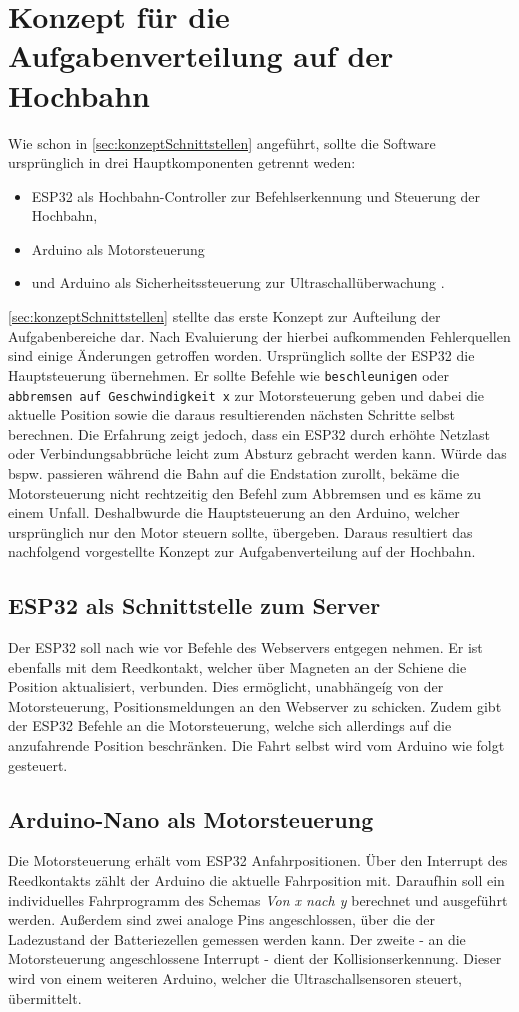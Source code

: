 \section{Konzept für die Aufgabenverteilung auf der Hochbahn}
\label{sec:hochbahnAlsClient}
Wie schon in \autoref{sec:konzeptSchnittstellen} angeführt, sollte die Software ursprünglich in drei Hauptkomponenten getrennt weden:
\begin{itemize}
	\item ESP32 als Hochbahn-Controller zur Befehlserkennung und Steuerung der Hochbahn,
	\item Arduino als Motorsteuerung
	\item  und Arduino als Sicherheitssteuerung zur Ultraschallüberwachung .
\end{itemize}
\autoref{sec:konzeptSchnittstellen} stellte das erste Konzept zur Aufteilung der Aufgabenbereiche dar. Nach Evaluierung der hierbei aufkommenden Fehlerquellen sind einige Änderungen getroffen worden.
Ursprünglich sollte der ESP32 die Hauptsteuerung übernehmen. Er sollte Befehle wie \texttt{beschleunigen} oder \texttt{abbremsen auf Geschwindigkeit x} zur Motorsteuerung geben und dabei die aktuelle Position sowie die daraus resultierenden nächsten Schritte selbst berechnen. Die Erfahrung zeigt jedoch, dass ein ESP32 durch erhöhte Netzlast oder Verbindungsabbrüche leicht zum Absturz gebracht werden kann. Würde das bspw. passieren während die Bahn auf die Endstation zurollt, bekäme die Motorsteuerung nicht rechtzeitig den Befehl zum Abbremsen und es käme zu einem Unfall.
Deshalbwurde die Hauptsteuerung an den Arduino, welcher ursprünglich nur den Motor steuern sollte, übergeben. Daraus resultiert das nachfolgend vorgestellte Konzept zur Aufgabenverteilung auf der Hochbahn.

\subsection{ESP32 als Schnittstelle zum Server}
\label{sec:aufgabeESP}
Der ESP32 soll nach wie vor Befehle des Webservers entgegen nehmen. Er ist ebenfalls mit dem Reedkontakt, welcher über Magneten an der Schiene die Position aktualisiert, verbunden. Dies ermöglicht, unabhängeíg von der Motorsteuerung, Positionsmeldungen an den Webserver zu schicken. Zudem gibt der ESP32 Befehle an die Motorsteuerung, welche sich allerdings auf die anzufahrende Position beschränken. Die Fahrt selbst wird vom Arduino wie folgt gesteuert.

\subsection{Arduino-Nano als Motorsteuerung}
\label{sec:aufgabeArduinoNanoMotor}
Die Motorsteuerung erhält vom ESP32 Anfahrpositionen. Über den Interrupt des Reedkontakts zählt der Arduino die aktuelle Fahrposition mit. Daraufhin soll ein individuelles Fahrprogramm des Schemas \textit{Von x nach y} berechnet und ausgeführt werden. Außerdem sind zwei analoge Pins angeschlossen, über die der Ladezustand der Batteriezellen gemessen werden kann. Der zweite - an die Motorsteuerung angeschlossene Interrupt - dient der Kollisionserkennung. Dieser wird von einem weiteren Arduino, welcher die Ultraschallsensoren steuert, übermittelt. 

